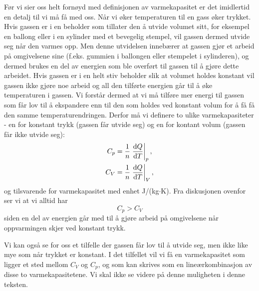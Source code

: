 Før vi sier oss helt fornøyd med definisjonen av varmekapasitet er det imidlertid en detalj til vi må få med oss. Når vi øker temperaturen til en gass øker trykket. Hvis gassen er i en beholder som tillater den å utvide volumet sitt, for eksempel en ballong eller i en sylinder med et bevegelig stempel, vil gassen dermed utvide seg når den varmes opp. Men denne utvidelsen innebærer at gassen gjør et arbeid på omgivelsene sine (f.eks. gummien i ballongen eller stempelet i sylinderen), og dermed brukes en del av energien som ble overført til gassen til å gjøre dette arbeidet. Hvis gassen er i en helt stiv beholder slik at volumet holdes konstant vil gassen ikke gjøre noe arbeid og all den tilførte energien går til å øke temperaturen i gassen. Vi forstår dermed at vi må tilføre mer energi til gassen som får lov til å ekspandere enn til den som holdes ved konstant volum for å få få den samme temperaturendringen. Derfor må vi definere to ulike varmekapasiteter - en for konstant trykk (gassen får utvide seg) og en for kontant volum (gassen får ikke utvide seg):
\begin{displaymath}
	\begin{aligned}
	C_p &= \frac{1}{n}\left.\frac{\text{d} Q}{\text{d} T}\right|_p, \\
	C_V &= \frac{1}{n}\left.\frac{\text{d} Q}{\text{d} T}\right|_V,
	\end{aligned}
\end{displaymath}
og tilsvarende for varmekapasitet med enhet J/(kg$\cdot$K). Fra diskusjonen ovenfor ser vi at vi alltid har
\begin{displaymath}
	C_p > C_V
\end{displaymath}
siden en del av energien går med til å gjøre arbeid på omgivelsene når oppvarmingen skjer ved konstant trykk.

Vi kan også se for oss et tilfelle der gassen får lov til å utvide seg, men ikke like mye som når trykket er konstant. I det tilfellet vil vi få en varmekapasitet som ligger et sted mellom $C_V$ og $C_p$, og som kan skrives som en lineærkombinasjon av disse to varmekapasitetene. Vi skal ikke se videre på denne muligheten i denne teksten.

